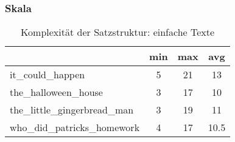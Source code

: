 \documentclass[10pt,a4paper]{article}
\begin{document}
	\subsubsection*{Skala}
	\begin{table}[H]
		\centering
		\begin{tabular}{|l|c|c|c|}
			\hline  & min & max & avg \\ 
			\hline it\_could\_happen & 5 & 21 & 13 \\ 
			\hline the\_halloween\_house & 3 & 17 & 10 \\ 
			\hline the\_little\_gingerbread\_man & 3 & 19 & 11 \\ 
			\hline who\_did\_patricks\_homework & 4 & 17 & 10.5 \\ 
			\hline 
		\end{tabular} 
		\caption{Komplexität der Satzstruktur: einfache Texte}
	\end{table}
		
\end{document}
